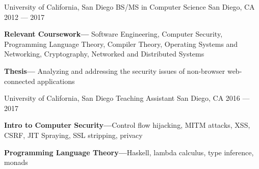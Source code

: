 


\begin{cventries}


\cventry
  {University of California, San Diego} %
  {BS/MS in Computer Science} %
  {San Diego, CA} %
  {2012 --- 2017} %
  {%
  \begin{cvitems}
    \item{\textbf{Relevant Coursework---} Software Engineering, Computer
      Security, Programming Language Theory, Compiler Theory, Operating Systems
      and Networking, Cryptography, Networked and Distributed Systems}
    \item{\textbf{Thesis---} Analyzing and addressing the security issues of
      non-browser web-connected applications}
  \end{cvitems}
  }

\cventry
{University of California, San Diego} %
{Teaching Assistant} %
{San Diego, CA} %
{2016 --- 2017} %
{%
  \begin{cvitems}
    \item {\textbf{Intro to Computer Security---}Control flow hijacking, MITM
      attacks, XSS, CSRF, JIT Spraying, SSL stripping, privacy}
    \item {\textbf{Programming Language Theory---}Haskell, lambda calculus, type
      inference, monads}
  \end{cvitems}
}


\end{cventries}
